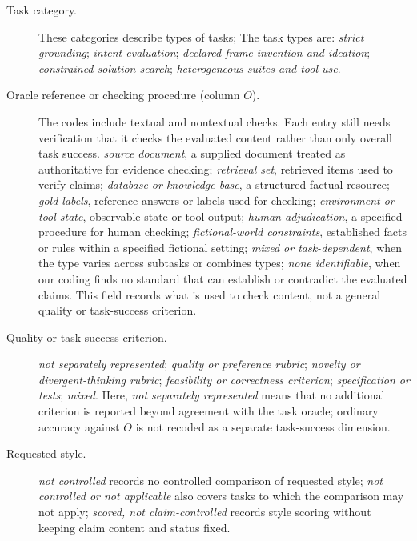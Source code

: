\documentclass{clv2025}
\begin{document}
\begin{description}
  \item[Task category.]
  These categories describe types of tasks; %
  The task types are: \emph{strict grounding};
  \emph{intent evaluation};
  \emph{declared-frame invention and ideation};
  \emph{constrained solution search};
  \emph{heterogeneous suites and tool use}.

  \item[Oracle reference or checking procedure (column $O$).]
  The codes include textual and nontextual checks. Each entry still needs
  verification that it checks the evaluated content rather than only overall
  task success.
  \emph{source document}, a supplied document treated as authoritative for
  evidence checking;
  \emph{retrieval set}, retrieved items used to verify claims;
  \emph{database or knowledge base}, a structured factual resource;
  \emph{gold labels}, reference answers or labels used for checking;
  \emph{environment or tool state}, observable state or tool output;
  \emph{human adjudication}, a specified procedure for human checking;
  \emph{fictional-world constraints}, established facts or rules within a
  specified fictional setting;
  \emph{mixed or task-dependent}, when the type varies across subtasks or
  combines types;
  \emph{none identifiable}, when our coding finds no standard that can
  establish or contradict the evaluated claims.
  This field records what is used to check content, not a general quality or
  task-success criterion.

  \item[Quality or task-success criterion.]
  \emph{not separately represented};
  \emph{quality or preference rubric};
  \emph{novelty or divergent-thinking rubric};
  \emph{feasibility or correctness criterion};
  \emph{specification or tests};
  \emph{mixed}.
  Here, \emph{not separately represented} means that no additional criterion
  is reported beyond agreement with the task oracle; ordinary accuracy against
  $O$ is not recoded as a separate task-success dimension.

  \item[Requested style.]
  \emph{not controlled} records no controlled comparison of requested style;
  \emph{not controlled or not applicable} also covers tasks to which the
  comparison may not apply;
  \emph{scored, not claim-controlled} records style scoring without keeping
  claim content and status fixed.


\end{description}
\end{document}
